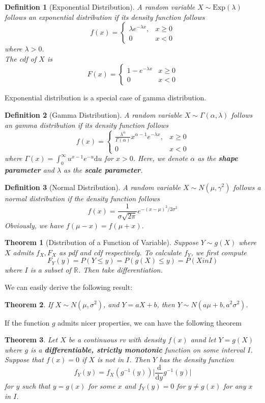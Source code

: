 \documentclass[12pt]{article}
\newcommand{\diff}{\mathrm{d}}
\newcommand{\expo}{\mathrm{Exp}}
\newtheorem{definition}{Definition}[section]
\newtheorem{theorem}{Theorem}[section]
\theoremstyle{definition}
\begin{document}
\begin{definition}[Exponential Distribution]
\normalfont A random variable $X\sim\expo(\lambda)$ follows an exponential distribution if its density function follows
\[
f(x)=\begin{cases}
\lambda e^{-\lambda x}, &x\geq 0\\
0 &x<0
\end{cases}
\]
where $\lambda>0$.\\
The cdf of $X$ is
\[
F(x) = \begin{cases}
1-e^{-\lambda x} & x\geq 0\\
0 & x<0
\end{cases}
\]
\end{definition}
Exponential distribution is a special case of gamma distribution.
\begin{definition}[Gamma Distribution]
\normalfont A random variable $X\sim\Gamma(\alpha, \lambda)$ follows an gamma distribution if its density function follows
\[
f(x) = \begin{cases} \frac{\lambda^\alpha}{\Gamma(\alpha)} x^{\alpha-1}e^{-\lambda x}, &x\geq 0\\
0 & x<0
\end{cases}
\]
where $\Gamma(x) = \int_0^\infty u^{x-1}e^{-u}\diff u$ for $x>0$.
Here, we denote $\alpha$ as the \textbf{shape parameter} and $\lambda$ as the \textbf{scale parameter}.
\end{definition}
\begin{definition}[Normal Distribution]
\normalfont A random variable $X\sim N(\mu, \gamma^2)$ follows a normal distribution if the density function follows
\[
f(x) = \frac{1}{\sigma \sqrt{2\pi}} e^{-(x-\mu)^2/2\sigma^2}
\]
Obviously, we have $f(\mu-x) = f(\mu+x)$.
\end{definition}
\begin{theorem}[Distribution of a Function of Variable]
\hfill Suppose $Y\sim g(X)$ where $X$ admits $f_X, F_X$ as pdf and cdf respectively. To calculate $f_Y$, we first compute
\[
F_Y(y) = P(Y\leq y) = P(g(X)\leq y) = P(X in I) 
\]
where $I$ is a subset of $\mathbb{R}$. Then take differentiation.
\end{theorem}
We can easily derive the following result:
\begin{theorem}
\normalfont If $X\sim N(\mu, \sigma^2)$, and $Y=aX+b$, then $Y\sim N(a\mu+b, a^2\sigma^2)$.
\end{theorem}
If the function $g$ admits nicer properties, we can have the following theorem
\begin{theorem}
\normalfont Let $X$ be a continuous rv with density $f(x)$ annd let $Y = g(X)$ where $g$ is a \textbf{differentiable, strictly monotonic} function on some interval $I$. Suppose that $f(x) = 0$ if $X$ is not in $I$. Then $Y$ has the density function
\[
f_Y(y) = f_X(g^{-1}(y))\lvert\frac{\diff}{\diff y} g^{-1}(y)\rvert
\]
for $y$ such that $y=g(x)$ for some $x$ and $f_Y(y) = 0$ for $y\neq g(x)$ for any $x$ in $I$. 
\end{theorem}
\end{document}
